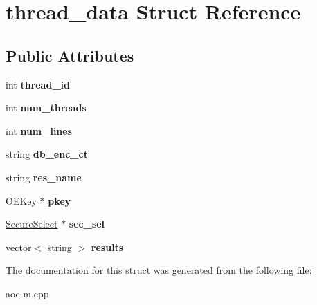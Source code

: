 \hypertarget{structthread__data}{\section{thread\-\_\-data Struct Reference}
\label{structthread__data}
}
\subsection*{Public Attributes}
\begin{DoxyCompactItemize}
\item 
\hypertarget{structthread__data_a7f99c8728f153827a108b77f60420074}{int {\bfseries thread\-\_\-id}}\label{structthread__data_a7f99c8728f153827a108b77f60420074}

\item 
\hypertarget{structthread__data_ac406249a3baf00e1ff1948e3384e4fd9}{int {\bfseries num\-\_\-threads}}\label{structthread__data_ac406249a3baf00e1ff1948e3384e4fd9}

\item 
\hypertarget{structthread__data_a37189156dac628a7eeb2d407e9e76eb4}{int {\bfseries num\-\_\-lines}}\label{structthread__data_a37189156dac628a7eeb2d407e9e76eb4}

\item 
\hypertarget{structthread__data_ac1995c6d9ca873a4678fda316dbce74b}{string {\bfseries db\-\_\-enc\-\_\-ct}}\label{structthread__data_ac1995c6d9ca873a4678fda316dbce74b}

\item 
\hypertarget{structthread__data_a2210f39da12da0f53ad37d25a1b6ccb0}{string {\bfseries res\-\_\-name}}\label{structthread__data_a2210f39da12da0f53ad37d25a1b6ccb0}

\item 
\hypertarget{structthread__data_a57def2bfd78dc7c03a3096241a5fa387}{O\-E\-Key $\ast$ {\bfseries pkey}}\label{structthread__data_a57def2bfd78dc7c03a3096241a5fa387}

\item 
\hypertarget{structthread__data_accb6bab64d9749d50ab0e80f7f65f2fc}{\hyperlink{classSecureSelect}{Secure\-Select} $\ast$ {\bfseries sec\-\_\-sel}}\label{structthread__data_accb6bab64d9749d50ab0e80f7f65f2fc}

\item 
\hypertarget{structthread__data_a85af402928bace8d5b324fa82e6df04d}{vector$<$ string $>$ {\bfseries results}}\label{structthread__data_a85af402928bace8d5b324fa82e6df04d}

\end{DoxyCompactItemize}


The documentation for this struct was generated from the following file\-:\begin{DoxyCompactItemize}
\item 
aoe-\/m.\-cpp\end{DoxyCompactItemize}

